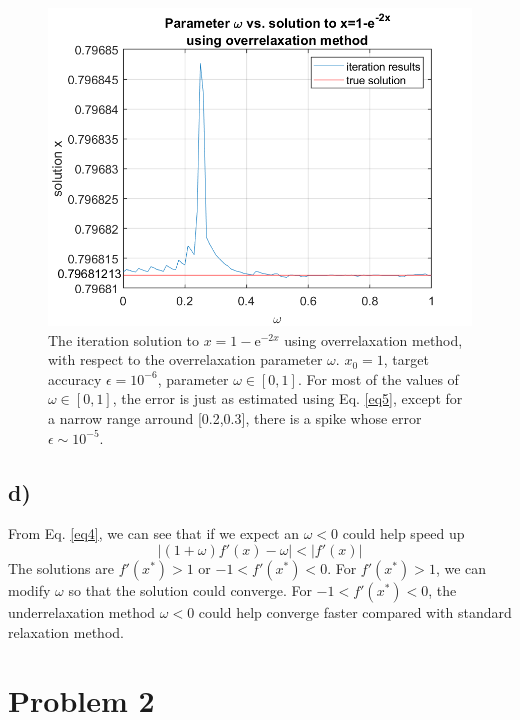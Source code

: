 \documentclass[12pt, graphicx]{article}
\begin{document}
\begin{figure}[ht]
\centering
\includegraphics[width = 120mm]{overresult.png}
\caption{The iteration solution to $x=1-\mathrm{e}^{-2x}$ using overrelaxation method, with respect to the overrelaxation parameter $\omega$. $x_0=1$, target accuracy $\epsilon=10^{-6}$, parameter $\omega\in[0,1]$.  For most of the values of $\omega\in[0,1]$, the error is just as estimated using Eq. \ref{eq5}, except for a narrow range arround [0.2,0.3], there is a spike whose error $\epsilon\sim10^{-5}$.}
\label{fig:overresult}
\end{figure}

\subsection*{d)}
From Eq. \ref{eq4}, we can see that if we expect an $\omega<0$ could help speed up 
\begin{equation}
|(1+\omega)f'(x)-\omega|<|f'(x)|
\end{equation}
The solutions are $f'(x^*)>1$ or $-1<f'(x^*)<0$. For $f'(x^*)>1$, we can modify $\omega$ so that the solution could converge. For $-1<f'(x^*)<0$, the underrelaxation method $\omega<0$ could help converge faster compared with standard relaxation method.

\section*{Problem 2}
\end{document}
